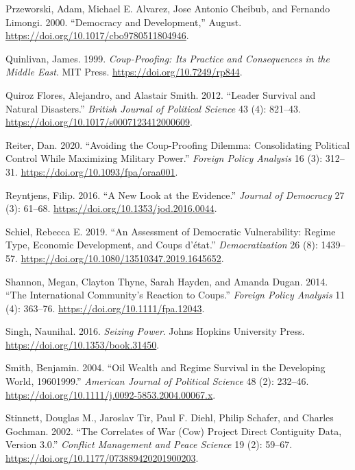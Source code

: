 \documentclass[
  12pt,
]{report}
\newlength{\cslhangindent}
\newenvironment{CSLReferences}[2] %
 {\begin{list}{}{%
  \setlength{\itemindent}{0pt}
  \setlength{\leftmargin}{0pt}
  \setlength{\parsep}{0pt}
  \ifodd #1
   \setlength{\leftmargin}{\cslhangindent}
   \setlength{\itemindent}{-1\cslhangindent}
  \fi
  \setlength{\itemsep}{#2\baselineskip}}}
 {\end{list}}
\begin{document}
\begin{CSLReferences}{1}{0}
Przeworski, Adam, Michael E. Alvarez, Jose Antonio Cheibub, and Fernando
Limongi. 2000. {``Democracy and Development,''} August.
\url{https://doi.org/10.1017/cbo9780511804946}.

Quinlivan, James. 1999. \emph{Coup-Proofing: Its Practice and
Consequences in the Middle East}. MIT Press.
\url{https://doi.org/10.7249/rp844}.

Quiroz Flores, Alejandro, and Alastair Smith. 2012. {``Leader Survival
and Natural Disasters.''} \emph{British Journal of Political Science} 43
(4): 821--43. \url{https://doi.org/10.1017/s0007123412000609}.

Reiter, Dan. 2020. {``Avoiding the Coup-Proofing Dilemma: Consolidating
Political Control While Maximizing Military Power.''} \emph{Foreign
Policy Analysis} 16 (3): 312--31.
\url{https://doi.org/10.1093/fpa/oraa001}.

Reyntjens, Filip. 2016. {``A New Look at the Evidence.''} \emph{Journal
of Democracy} 27 (3): 61--68.
\url{https://doi.org/10.1353/jod.2016.0044}.

Schiel, Rebecca E. 2019. {``An Assessment of Democratic Vulnerability:
Regime Type, Economic Development, and Coups d{'}état.''}
\emph{Democratization} 26 (8): 1439--57.
\url{https://doi.org/10.1080/13510347.2019.1645652}.

Shannon, Megan, Clayton Thyne, Sarah Hayden, and Amanda Dugan. 2014.
{``The International Community's Reaction to Coups.''} \emph{Foreign
Policy Analysis} 11 (4): 363--76.
\url{https://doi.org/10.1111/fpa.12043}.

Singh, Naunihal. 2016. \emph{Seizing Power}. Johns Hopkins University
Press. \url{https://doi.org/10.1353/book.31450}.

Smith, Benjamin. 2004. {``Oil Wealth and Regime Survival in the
Developing World, 1960{\textendash}1999.''} \emph{American Journal of
Political Science} 48 (2): 232--46.
\url{https://doi.org/10.1111/j.0092-5853.2004.00067.x}.

Stinnett, Douglas M., Jaroslav Tir, Paul F. Diehl, Philip Schafer, and
Charles Gochman. 2002. {``The Correlates of War (Cow) Project Direct
Contiguity Data, Version 3.0.''} \emph{Conflict Management and Peace
Science} 19 (2): 59--67.
\url{https://doi.org/10.1177/073889420201900203}.


\end{CSLReferences}
\end{document}
